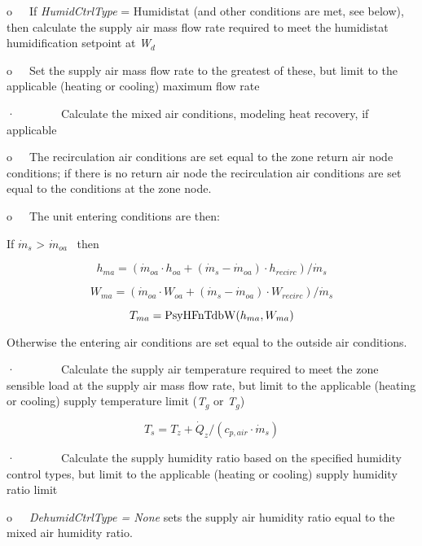 o~~~If \emph{HumidCtrlType} = Humidistat (and other conditions are met, see below), then calculate the supply air mass flow rate required to meet the humidistat humidification setpoint at \emph{W\(_{d}\)}

o~~~Set the supply air mass flow rate to the greatest of these, but limit to the applicable (heating or cooling) maximum flow rate

·~~~~~~~~Calculate the mixed air conditions, modeling heat recovery, if applicable

o~~~The recirculation air conditions are set equal to the zone return air node conditions; if there is no return air node the recirculation air conditions are set equal to the conditions at the zone node.

o~~~The unit entering conditions are then:

If \({\dot m_s}\) \textgreater{} \({\dot m_{oa}}\) ~then

\begin{equation}
{h_{ma}} = ({\dot m_{oa}} \cdot {h_{oa}} + ({\dot m_s} - {\dot m_{oa}}) \cdot {h_{recirc}})/{\dot m_s}
\end{equation}

\begin{equation}
{W_{ma}} = ({\dot m_{oa}} \cdot {W_{oa}} + ({\dot m_s} - {\dot m_{oa}}) \cdot {W_{recirc}})/{\dot m_s}
\end{equation}

\begin{equation}
{T_{ma}} = {\mathop{\rm PsyHFnTdbW}\nolimits} ({h_{ma}},{W_{ma}})
\end{equation}

Otherwise the entering air conditions are set equal to the outside air conditions.

·~~~~~~~~Calculate the supply air temperature required to meet the zone sensible load at the supply air mass flow rate, but limit to the applicable (heating or cooling) supply temperature limit (\emph{T\(_{g}\)} or \emph{T\(_{g}\)})

\begin{equation}
{T_s} = {T_z} + {\dot Q_z}/({c_{p,air}}\cdot {\dot m_s})
\end{equation}

·~~~~~~~~Calculate the supply humidity ratio based on the specified humidity control types, but limit to the applicable (heating or cooling) supply humidity ratio limit

o~~~\emph{DehumidCtrlType = None} sets the supply air humidity ratio equal to the mixed air humidity ratio.

